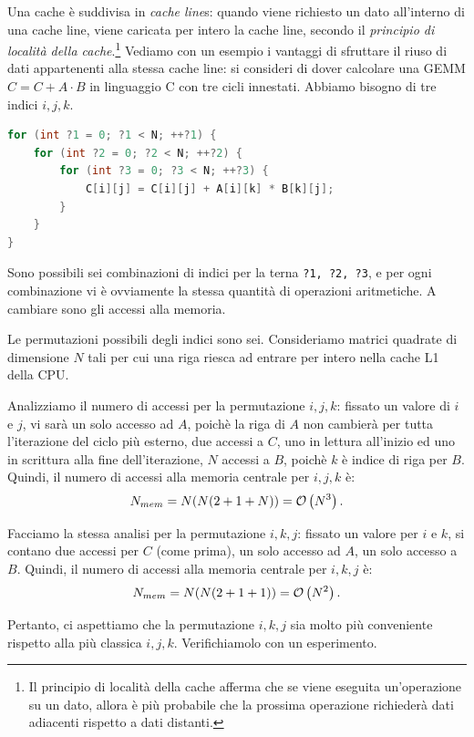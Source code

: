 Una cache è suddivisa in \emph{cache line}s: quando viene richiesto un dato all'interno di una cache line, viene caricata per intero la cache line, secondo il \emph{principio di località della cache}.\footnote{Il principio di località della cache afferma che se viene eseguita un'operazione su un dato, allora è più probabile che la prossima operazione richiederà dati adiacenti rispetto a dati distanti.}
Vediamo con un esempio i vantaggi di sfruttare il riuso di dati appartenenti alla stessa cache line: si consideri di dover calcolare una GEMM \(C = C + A\cdot B\) in linguaggio C con tre cicli innestati.
Abbiamo bisogno di tre indici \(i,j,k\).
\begin{lstlisting}[language=c]
for (int ?1 = 0; ?1 < N; ++?1) {
    for (int ?2 = 0; ?2 < N; ++?2) {
        for (int ?3 = 0; ?3 < N; ++?3) {
            C[i][j] = C[i][j] + A[i][k] * B[k][j];
        }
    }
}
\end{lstlisting}
Sono possibili sei combinazioni di indici per la terna \texttt{?1, ?2, ?3}, e per ogni combinazione vi è ovviamente la stessa quantità di operazioni aritmetiche. A cambiare sono gli accessi alla memoria.

Le permutazioni possibili degli indici sono sei.
Consideriamo matrici quadrate di dimensione \(N\) tali per cui una riga riesca ad entrare per intero nella cache L1 della CPU.

Analizziamo il numero di accessi per la permutazione \(i,j,k\): fissato un valore di \(i\) e \(j\), vi sarà un solo accesso ad \(A\), poichè la riga di \(A\) non cambierà per tutta l'iterazione del ciclo più esterno, due accessi a \(C\), uno in lettura all'inizio ed uno in scrittura alla fine dell'iterazione, \(N\) accessi a \(B\), poichè \(k\) è indice di riga per \(B\).
Quindi, il numero di accessi alla memoria centrale per \(i,j,k\) è:
\[ N_{mem} = N(N(2 + 1 + N)) = \mathcal{O}\left(N^3\right). \]

Facciamo la stessa analisi per la permutazione \(i,k,j\): fissato un valore per \(i\) e \(k\), si contano due accessi per \(C\) (come prima), un solo accesso ad \(A\), un solo accesso a \(B\).
Quindi, il numero di accessi alla memoria centrale per \(i,k,j\) è:
\[ N_{mem} = N(N(2 + 1 + 1)) = \mathcal{O}\left(N^2\right). \]

Pertanto, ci aspettiamo che la permutazione \(i,k,j\) sia molto più conveniente rispetto alla più classica \(i,j,k\). Verifichiamolo con un esperimento.

